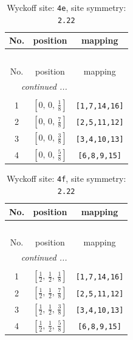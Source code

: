 \documentclass[fleqn,8pt]{jsarticle}
\begin{document}
\renewcommand{\arraystretch}{1.2}
\begin{longtable}{ccc}
\caption{Wyckoff site: {\tt 4e}, site symmetry: {\tt 2.22}}
 \\
 \hline \hline
No. & position & mapping \\ \hline \endfirsthead

\multicolumn{2}{l}{\tablename\ \thetable{}} \\
 \hline \hline
No. & position & mapping \\ \hline \endhead

 \hline \hline
\multicolumn{2}{r}{\footnotesize\it continued ...} \\ \endfoot

 \hline \hline
\multicolumn{2}{r}{} \\ \endlastfoot

1 & $\left[ 0,\, 0,\, \frac{1}{8} \right]$ & {\tt [1,7,14,16]} \\ \hline
2 & $\left[ 0,\, 0,\, \frac{7}{8} \right]$ & {\tt [2,5,11,12]} \\ \hline
3 & $\left[ 0,\, 0,\, \frac{3}{8} \right]$ & {\tt [3,4,10,13]} \\ \hline
4 & $\left[ 0,\, 0,\, \frac{5}{8} \right]$ & {\tt [6,8,9,15]} \\
\end{longtable}
\renewcommand{\arraystretch}{1.2}
\begin{longtable}{ccc}
\caption{Wyckoff site: {\tt 4f}, site symmetry: {\tt 2.22}}
 \\
 \hline \hline
No. & position & mapping \\ \hline \endfirsthead

\multicolumn{2}{l}{\tablename\ \thetable{}} \\
 \hline \hline
No. & position & mapping \\ \hline \endhead

 \hline \hline
\multicolumn{2}{r}{\footnotesize\it continued ...} \\ \endfoot

 \hline \hline
\multicolumn{2}{r}{} \\ \endlastfoot

1 & $\left[ \frac{1}{2},\, \frac{1}{2},\, \frac{1}{8} \right]$ & {\tt [1,7,14,16]} \\ \hline
2 & $\left[ \frac{1}{2},\, \frac{1}{2},\, \frac{7}{8} \right]$ & {\tt [2,5,11,12]} \\ \hline
3 & $\left[ \frac{1}{2},\, \frac{1}{2},\, \frac{3}{8} \right]$ & {\tt [3,4,10,13]} \\ \hline
4 & $\left[ \frac{1}{2},\, \frac{1}{2},\, \frac{5}{8} \right]$ & {\tt [6,8,9,15]} \\
\end{longtable}
\end{document}
